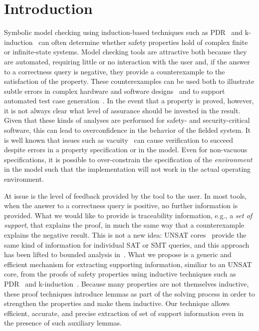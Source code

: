 \section{Introduction}
\label{sec:intro}


Symbolic model checking using induction-based techniques such as PDR~\cite{Een} and k-induction~\cite{Sheeran} can often determine whether safety properties hold of complex finite or infinite-state systems.  Model checking tools are attractive both because they are automated, requiring little or no interaction with the user and, if the answer to a correctness query is negative, they provide a counterexample to the satisfaction of the property.  These counterexamples can be used both to illustrate subtle errors in complex hardware and software designs~\cite{SoftwareModelCheckingTakesOff, more} and to support automated test case generation~\cite{Heimdahl, Gargantini}.
In the event that a property is proved, however, it is not always clear what level of assurance should be invested in the result.  Given that these kinds of analyses are performed for safety- and security-critical software, this can lead to overconfidence in the behavior of the fielded system.  It is well known that issues such as vacuity~\cite{Kupferman} can cause verification to succeed despite errors in a property specification or in the model. Even for non-vacuous specifications, it is possible to over-constrain the specification of the {\em environment} in the model such that the implementation will not work in the actual operating environment.

At issue is the level of feedback provided by the tool to the user. In
most tools, when the answer to a correctness query is positive, no
further information is provided. What we would like to provide is
traceability information, e.g., a {\em set of support}, that explains
the proof, in much the same way that a counterexample explains the
negative result. This is not a new idea: UNSAT cores~\cite{Who Did
  this?} provide the same kind of information for individual SAT or
SMT queries, and this approach has been lifted to bounded analysis
in~\cite{Kodkodpaper}. What we propose is a generic and efficient
mechanism for extracting supporting information, similiar to an UNSAT
core, from the proofs of safety properties using inductive techniques
such as PDR~\cite{Een} and k-induction~\cite{Sheeran}. Because many
properties are not themselves inductive, these proof techniques
introduce lemmas as part of the solving process in order to strengthen
the properties and make them inductive. Our technique allows
efficient, accurate, and precise extraction of set of support
information even in the presence of such auxiliary lemmas.

